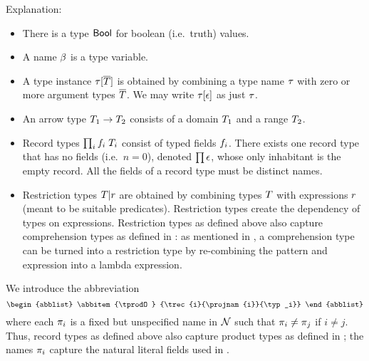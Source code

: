Explanation:
\begin{itemize}
\item
There is a type $\mathsf{Bool}$ for boolean (i.e.\ truth) values.
\item
A name $\beta$ is a type variable.
\item
A type instance $\tau[\overline{T}]$ is obtained by combining a type name $\tau$ with
zero or more argument types $\overline{T}$. We may write $\tau[\epsilon]$ as
just $\tau$.
\item
An arrow type $T_1\to T_2$ consists of a domain $T_1$ and a range $T_2$.
\item
Record types $\prod_{i}f_i\;T_i$ consist of typed fields $f_i$. There exists one
record type that has no fields (i.e.\ $n=0$), denoted $\prod\epsilon$, whose only
inhabitant is the empty record. All the fields of a record type must be
distinct names.
\item
Restriction types $T|r$ are obtained by combining types $T$ with
expressions $r$ (meant to be suitable predicates). Restriction types
create the dependency of types on expressions. Restriction types as defined
above also capture comprehension types as defined in \cite{lm}: as mentioned
in \cite{lm}, a comprehension type can be turned into a restriction type by
re-combining the pattern and expression into a lambda expression.
\end{itemize}

We introduce the abbreviation
\[
\begin{abblist}
\abbitem{\tprodO}
        {\trec{i}{\projnam{i}}{\typ_i}}
\end{abblist}
\]
where each $\pi_{i}$ is a fixed but unspecified name in $\mathcal{N}$ such that
$\pi_{i}\neq\pi_{j}$ if $i\neq j$. Thus, record types as defined above
also capture product types as defined in \cite{lm}; the names $\pi_{i}$
capture the natural literal fields used in \cite{lm}.

